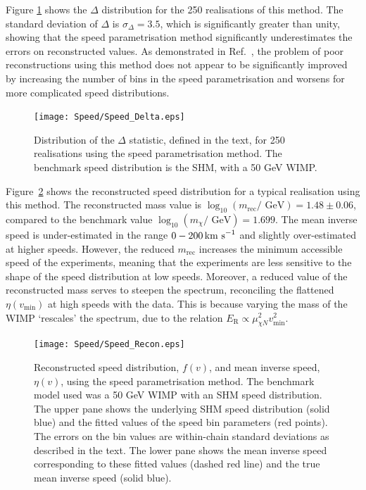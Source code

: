 Figure \ref{fig:Speed:Speed_Delta} shows the \(\Delta\) distribution for the 250 realisations of this method. The standard deviation of \(\Delta\) is \(\sigma_\Delta = 3.5\), which is significantly greater than unity, showing that the speed parametrisation method significantly underestimates the errors on reconstructed values. As demonstrated in Ref.\ \cite{Peter:2011}, the problem of poor reconstructions using this method does not appear to be significantly improved by increasing the number of bins in the speed parametrisation and worsens for more complicated speed distributions.

 \begin{figure}[t]
\centering
  \texttt{[image: Speed/Speed\_Delta.eps]}
  \caption[Distribution of the pull statistic $\delta$ using the binned speed parametrisation]{Distribution of the $\Delta$ statistic, defined in the text, for 250 realisations using the speed parametrisation method. The benchmark speed distribution is the SHM, with a 50 GeV WIMP.} 
  \label{fig:Speed:Speed_Delta}
\end{figure}

Figure~\ref{fig:Speed:Speed_Recon} shows the reconstructed speed distribution for a typical realisation using this method. The reconstructed mass value is \(\log_{10} (m_\textrm{rec} / \textrm{ GeV}) = 1.48 \pm 0.06\), compared to the benchmark value \(\log_{10} (m_\chi / \textrm{ GeV}) = 1.699\). The mean inverse speed is under-estimated in the range \(0 - 200 \,\textrm{km s}^{-1}\) and slightly over-estimated at higher speeds. However, the reduced \(m_\textrm{rec}\) increases the minimum accessible speed of the experiments, meaning that the experiments are less sensitive to the shape of the speed distribution at low speeds. Moreover, a reduced value of the reconstructed mass serves to steepen the spectrum, reconciling the flattened \(\eta(v_\textrm{min})\) at high speeds with the data. This is because varying the mass of the WIMP `rescales' the spectrum, due to the relation \(E_\textrm{R} \propto \mu_{\chi N}^2 v_{\textrm{min}}^2\).


 \begin{figure}[t]
\centering
  \texttt{[image: Speed/Speed\_Recon.eps]}
\caption[Reconstructed speed distribution and mean inverse speed using the binned speed parametrisation]{Reconstructed speed distribution, $f(v)$, and mean inverse speed, $\eta(v)$, using the speed parametrisation method. The benchmark model used was a 50 GeV WIMP with an SHM speed distribution. The upper pane shows the underlying SHM speed distribution (solid blue) and the fitted values of the speed bin parameters (red points). The errors on the bin values are within-chain standard deviations as described in the text. The lower pane shows the mean inverse speed corresponding to these fitted values (dashed red line) and the true mean inverse speed (solid blue).}
  \label{fig:Speed:Speed_Recon}
\end{figure}

